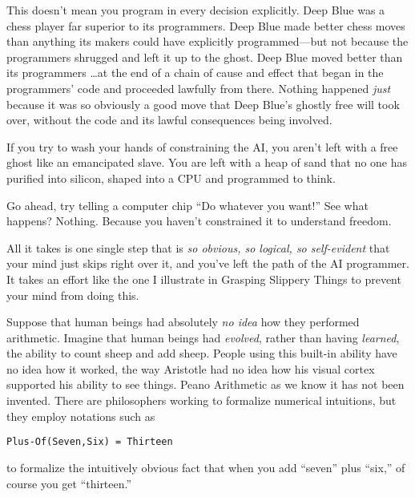 {
 This doesn't mean you program in every decision
explicitly. Deep Blue was a chess player far superior to its
programmers. Deep Blue made better chess moves than anything its makers
could have explicitly programmed---but not because the programmers
shrugged and left it up to the ghost. Deep Blue moved better than its
programmers \ldots at the end of a chain of cause and effect that began
in the programmers' code and proceeded lawfully from
there. Nothing happened \textit{just} because it was so obviously a
good move that Deep Blue's ghostly free will took over,
without the code and its lawful consequences being involved.}

{
 If you try to wash your hands of constraining the AI, you
aren't left with a free ghost like an emancipated
slave. You are left with a heap of sand that no one has purified into
silicon, shaped into a CPU and programmed to think.}

{
 Go ahead, try telling a computer chip ``Do
whatever you want!'' See what happens? Nothing.
Because you haven't constrained it to understand
freedom.}

{
 All it takes is one single step that is \textit{so obvious, so
logical, so self-evident} that your mind just skips right over it, and
you've left the path of the AI programmer. It takes an
effort like the one I illustrate in Grasping Slippery Things to prevent
your mind from doing this.}

\myendsectiontext


{
 Suppose that human beings had absolutely \textit{no idea} how they
performed arithmetic. Imagine that human beings had \textit{evolved},
rather than having \textit{learned}, the ability to count sheep and add
sheep. People using this built-in ability have no idea how it worked,
the way Aristotle had no idea how his visual cortex supported his
ability to see things. Peano Arithmetic as we know it has not been
invented. There are philosophers working to formalize numerical
intuitions, but they employ notations such as}

\begin{center}
\texttt{Plus-Of(Seven,Six) = Thirteen}
\end{center}

{
 to formalize the intuitively obvious fact that when you add
``seven'' plus
``six,'' of course you get
``thirteen.'' }

